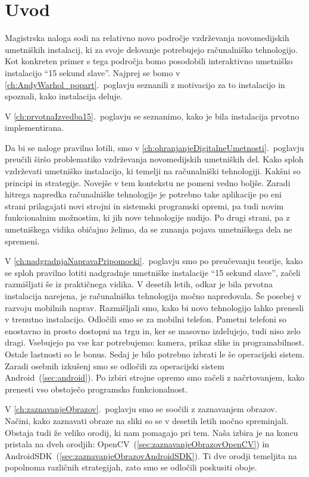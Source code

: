 \chapter{Uvod}
\newcommand{\refPoglavju}[1]{\ref{#1}.~poglavju}

Magistrska naloga sodi na relativno novo področje vzdrževanja novomedijskih
umetniških instalacij, ki za svoje delovanje potrebujejo računalniško
tehnologijo. Kot konkreten primer s tega področja bomo posodobili interaktivno
umetniško instalacijo ``15 sekund slave''. Najprej se bomo v
\refPoglavju{ch:AndyWarhol_popart} seznanili z motivacijo za to instalacijo in
spoznali, kako instalacija deluje.

V \refPoglavju{ch:prvotnaIzvedba15} se seznanimo, kako je bila instalacija
prvotno implementirana.

Da bi se naloge pravilno lotili, smo v
\refPoglavju{ch:ohranjanjeDigitalneUmetnosti} preučili širšo problematiko
vzdrževanja novomedijskih umetniških del. Kako sploh vzdrževati umetniško
instalacijo, ki temelji na računalniški tehnologiji. Kakšni so principi in
strategije. Novejše v tem kontekstu ne pomeni vedno boljše. Zaradi hitrega
napredka računalniške tehnologije je potrebno take aplikacije po eni strani
prilagajati novi strojni in sistemski programski opremi, pa tudi novim
funkcionalnim možnostim, ki jih nove tehnologije nudijo. Po drugi strani, pa z
umetniškega vidika običajno želimo, da se zunanja pojava umetniškega dela ne
spremeni.

V \refPoglavju{ch:nadgradnjaNapravaPripomocki} smo po preučevanju teorije,
kako se sploh pravilno lotiti nadgradnje umetniške instalacije ``15 sekund
slave'', začeli razmišljati še iz praktičnega vidika. V desetih letih, odkar
je bila prvotna instalacija narejena, je računalniška tehnologija močno
napredovala. Še posebej v razvoju mobilnih naprav. Razmišljali smo, kako bi
novo tehnologijo lahko prenesli v trenutno instalacijo. Odločili smo se za
mobilni telefon. Pametni telefoni so enostavno in prosto dostopni na trgu in,
ker se masovno izdelujejo, tudi niso zelo dragi. Vsebujejo pa vse kar
potrebujemo: kamera, prikaz slike in programabilnost. Ostale lastnosti so le
bonus. Sedaj je bilo potrebno izbrati le še operacijski sistem. Zaradi osebnih
izkušenj smo se odločili za operacijski sistem Android~(\ref{sec:android}). Po
izbiri strojne opremo smo začeli z načrtovanjem, kako prenesti vso obstoječo
programsko funkcionalnost.

V \refPoglavju{ch:zaznavanjeObrazov} smo se soočili z zaznavanjem obrazov.
Načini, kako zaznavati obraze na sliki so se v desetih letih močno
spreminjali. Obstaja tudi že veliko orodij, ki nam pomagajo pri tem. Naša
izbira je na koncu pristala na dveh orodjih:
OpenCV~(\ref{sec:zaznavanjeObrazovOpenCV}) in
AndroidSDK~(\ref{sec:zaznavanjeObrazovAndroidSDK}). Ti dve orodji temeljita na
popolnoma različnih strategijah, zato smo se odločili poskusiti oboje.


